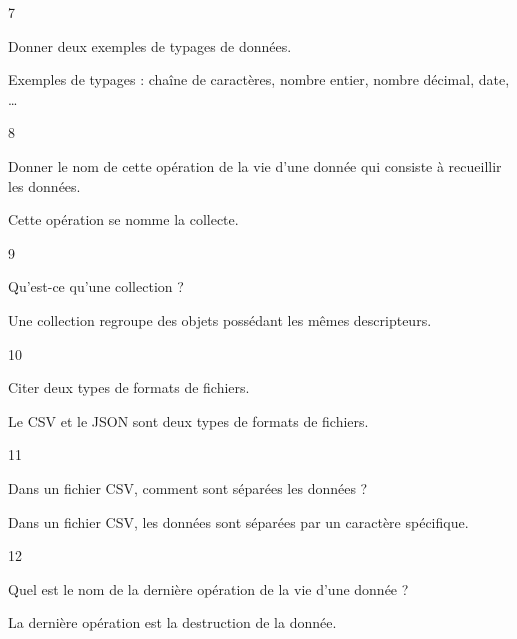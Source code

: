 \begin{taggedblock}{7}
\begin{exoq}
Donner deux exemples de typages de données.
\end{exoq} 
\begin{exor}
Exemples de typages : chaîne de caractères, nombre entier, nombre décimal, date, … \bqr
\end{exor} 
\end{taggedblock}

\begin{taggedblock}{8}
\begin{exoq}
Donner le nom de cette opération de la vie d'une donnée qui consiste à recueillir les données.
\end{exoq} 
\begin{exor}
Cette opération se nomme la collecte. \bqr
\end{exor} 
\end{taggedblock}

\begin{taggedblock}{9}
\begin{exoq}
Qu'est-ce qu'une collection ?
\end{exoq} 
\begin{exor}
Une collection regroupe des objets possédant les mêmes descripteurs. \bqr
\end{exor} 
\end{taggedblock}

\begin{taggedblock}{10}
\begin{exoq}
Citer deux types de formats de fichiers.
\end{exoq} 
\begin{exor}
Le CSV et le JSON sont deux types de formats de fichiers. \bqr
\end{exor} 
\end{taggedblock}

\begin{taggedblock}{11}
\begin{exoq}
Dans un fichier CSV, comment sont séparées les données ?
\end{exoq} 
\begin{exor}
Dans un fichier CSV, les données sont séparées par un caractère spécifique. \bqr
\end{exor} 
\end{taggedblock}

\begin{taggedblock}{12}
\begin{exoq}
Quel est le nom de la dernière opération de la vie d'une donnée ?
\end{exoq} 
\begin{exor}
La dernière opération est la destruction de la donnée. \bqr
\end{exor} 
\end{taggedblock}

